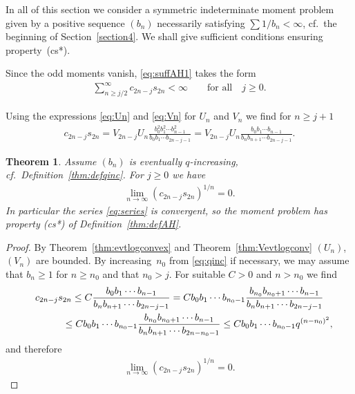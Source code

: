 \documentclass[pdftex]{sigma}
\numberwithin{equation}{section}
\newtheorem{thm}{Theorem}[section]
\begin{document}
In all of this section we consider a symmetric indeterminate moment problem given by a positive sequence $(b_n)$ necessarily satisfying $\sum 1/b_n<\infty$, cf.\ the beginning of Section~\ref{section4}. We shall give sufficient conditions ensuring property~(cs*).

Since the odd moments vanish, \eqref{eq:suffAH1} takes the form
\begin{gather}\label{eq:series}
\sum_{n\ge j/2}^\infty c_{2n-j}s_{2n}<\infty\qquad\text{for all}\quad j\ge 0.
\end{gather}

Using the expressions \eqref{eq:Un} and \eqref{eq:Vn} for $U_n$ and $V_n$ we find for $n\ge j+1$
 \begin{gather}\label{eq:UnVn}
c_{2n-j}s_{2n}= V_{2n-j}U_n\frac{b_0^2b_1^2\cdots b_{n-1}^2}{b_0b_1\cdots b_{2n-j-1}} =V_{2n-j}U_n\frac{b_0b_1\cdots b_{n-1}}{b_nb_{n+1}\cdots b_{2n-j-1}}.
\end{gather}

\begin{thm}\label{thm:AH-logcv2}Assume $(b_n)$ is eventually $q$-increasing, cf.\ Definition~{\rm \ref{thm:defqinc}}. For $j\ge 0$ we have
\begin{gather*}
\lim_{n\to \infty} (c_{2n-j}s_{2n})^{1/n}=0.
\end{gather*}
In particular the series \eqref{eq:series} is convergent, so the moment problem has property {\rm (cs*)} of Definition~{\rm \ref{thm:defAH}}.
\end{thm}

\begin{proof}By Theorem~\ref{thm:evtlogconvex} and Theorem~\ref{thm:Vevtlogconv} $(U_n)$, $(V_n)$ are bounded. By increasing~$n_0$ from \eqref{eq:qinc} if necessary, we may assume that $b_n\ge 1$ for $n\ge n_0$ and that $n_0>j$. For suitable $C>0$ and $n>n_0$ we find
\begin{gather*}
c_{2n-j}s_{2n} \le C{b_0b_1\cdots b_{n-1}\over b_nb_{n+1}\cdots b_{2n-j-1}} =Cb_0b_1\cdots b_{n_0-1}{b_{n_0}b_{n_0+1}\cdots b_{n-1}\over b_nb_{n+1}\cdots b_{2n-j-1}}\\
\hphantom{c_{2n-j}s_{2n}}{} \le C b_0b_1\cdots b_{n_0-1}{b_{n_0}b_{n_0+1}\cdots b_{n-1}\over b_nb_{n+1}\cdots b_{2n-n_0-1} }\le C b_0b_1\cdots b_{n_0-1}q^{(n-n_0)^2},
\end{gather*}
and therefore
\begin{gather*}
\lim_{n\to\infty}(c_{2n-j}s_{2n})^{1/n}=0.\tag*{\qed}
\end{gather*}\renewcommand{\qed}{}
\end{proof}
\end{document}
